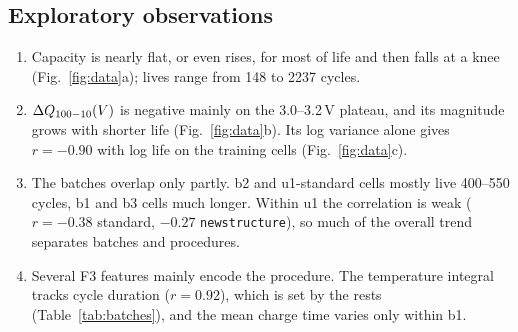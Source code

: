 \subsection{Exploratory observations}
\label{sec:eda}
\begin{enumerate}
  \item Capacity is nearly flat, or even rises, for most of life and then
  falls at a knee (Fig.~\ref{fig:data}a); lives range from 148 to 2237
  cycles.
  \item $\Delta Q_{100-10}(V)$ is negative mainly on the 3.0--3.2\,V plateau, and its
  magnitude grows with shorter life (Fig.~\ref{fig:data}b). Its log
  variance alone gives $r=-0.90$ with log life on the training cells
  (Fig.~\ref{fig:data}c).
  \item The batches overlap only partly. b2 and u1-standard cells mostly live
  400--550 cycles, b1 and b3 cells much longer. Within u1 the correlation
  is weak ($r=-0.38$ standard, $-0.27$ \texttt{newstructure}), so much of
  the overall trend separates batches and procedures.
  \item Several F3 features mainly encode the procedure. The temperature
  integral tracks cycle duration ($r=0.92$), which is set by the rests
  (Table~\ref{tab:batches}), and the mean charge time varies only within b1.
\end{enumerate}
